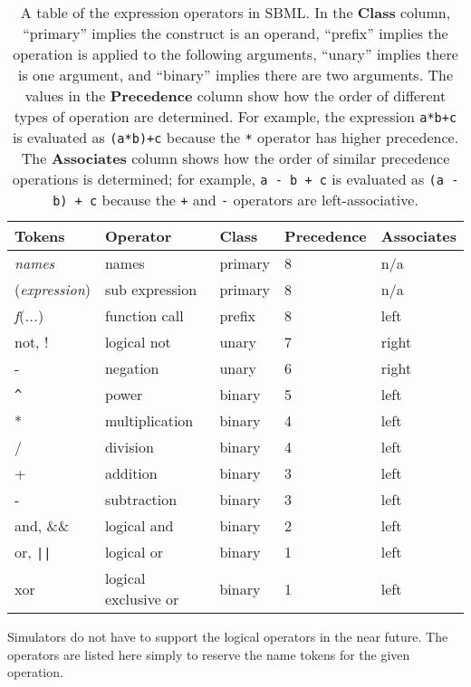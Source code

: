 \documentclass[10pt]{cek-article}
\begin{document}
\begin{table}[b]
\begin{center}
\begin{tabular}{lllll}
 \textbf{Tokens} & \textbf{Operator} & \textbf{Class} & \textbf{Precedence} & \textbf{Associates} \\
\hline
\emph{names} & names & primary & 8 & n/a \\
(\emph{expression}) & sub expression & primary & 8 & n/a\\
\emph{f}(\emph{...}) & function call & prefix & 8 & left\\
not, ! & logical not & unary & 7 & right\\
- & negation & unary & 6 & right\\
\verb|^| & power & binary & 5 & left \\
* & multiplication & binary & 4 & left\\
/ & division & binary & 4 & left\\
+ & addition & binary & 3 & left\\
- & subtraction & binary & 3 & left\\
and, \&\& & logical and & binary & 2 & left\\
or, \verb+||+ & logical or & binary & 1 & left\\
xor & logical exclusive or & binary & 1 & left
\end{tabular}
\end{center}
\caption{A table of the expression operators in SBML.  In the
  \textbf{Class} column, ``primary'' implies the construct is an operand,
  ``prefix'' implies the operation is applied to the following arguments,
  ``unary'' implies there is one argument, and ``binary'' implies there are
  two arguments.  The values in the \textbf{Precedence} column show how the
  order of different types of operation are determined.  For example, the
  expression \texttt{a*b+c} is evaluated as \texttt{(a*b)+c} because
  the \texttt{*} operator has higher precedence.  The \textbf{Associates}
  column shows how the order of similar precedence operations is
  determined; for example, \texttt{a - b + c} is evaluated as \texttt{(a -
    b) + c} because the \texttt{+} and \texttt{-} operators are
  left-associative.}
\label{tab:operators}
\end{table}

Simulators do not have to support the logical operators in the near
future.  The operators are listed here simply to reserve the name tokens
for the given operation.
\end{document}
